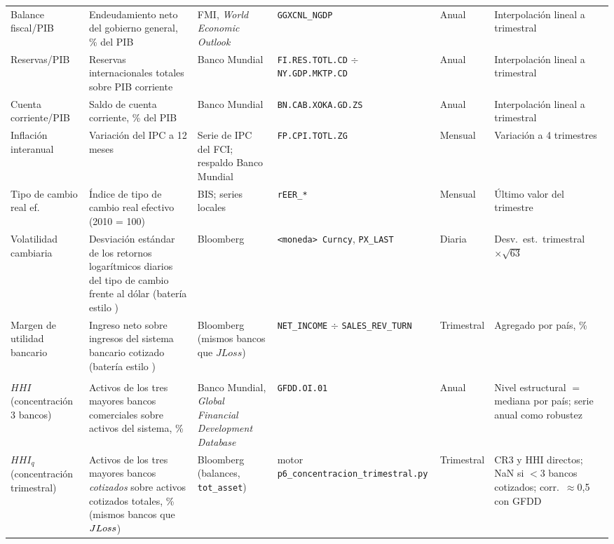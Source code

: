 \begin{footnotesize}
\begin{longtable}{%
  >{\Lc}p{2.15cm}%
  >{\Lc}p{2.7cm}%
  >{\Lc}p{1.8cm}%
  >{\Lc}p{2.85cm}%
  >{\Lc}p{1.75cm}%
  >{\Lc}p{2.5cm}}
Balance fiscal/PIB & Endeudamiento neto del gobierno general, \% del PIB & FMI, \textit{World Economic Outlook} & \texttt{GGXCNL\_NGDP} & Anual & Interpolación lineal a trimestral \\
Reservas/PIB & Reservas internacionales totales sobre PIB corriente & Banco Mundial & \texttt{FI.\allowbreak RES.\allowbreak TOTL.\allowbreak CD} $\div$ \texttt{NY.\allowbreak GDP.\allowbreak MKTP.\allowbreak CD} & Anual & Interpolación lineal a trimestral \\
Cuenta corriente/PIB & Saldo de cuenta corriente, \% del PIB & Banco Mundial & \texttt{BN.\allowbreak CAB.\allowbreak XOKA.\allowbreak GD.\allowbreak ZS} & Anual & Interpolación lineal a trimestral \\
Inflación interanual & Variación del IPC a 12 meses & Serie de IPC del FCI; respaldo Banco Mundial & \texttt{FP.\allowbreak CPI.\allowbreak TOTL.\allowbreak ZG} & Mensual & Variación a 4 trimestres \\
Tipo de cambio real ef. & Índice de tipo de cambio real efectivo (2010 = 100) & BIS; series locales & \texttt{rEER\_*} & Mensual & Último valor del trimestre \\
Volatilidad cambiaria & Desviación estándar de los retornos logarítmicos diarios del tipo de cambio frente al dólar (batería estilo \citealp{Chari2024b}) & Bloomberg & \texttt{<moneda> Curncy}, \texttt{PX\_LAST} & Diaria & Desv.\ est.\ trimestral $\times\sqrt{63}$ \\
Margen de utilidad bancario & Ingreso neto sobre ingresos del sistema bancario cotizado (batería estilo \citealp{Chari2024b}) & Bloomberg (mismos bancos que $JLoss$) & \texttt{NET\_\allowbreak INCOME} $\div$ \texttt{SALES\_\allowbreak REV\_\allowbreak TURN} & Trimestral & Agregado por país, \% \\
\addlinespace
\multicolumn{6}{l}{\textbf{\textit{Concentración bancaria e instituciones}}}\\
\addlinespace
$HHI$ (concentración 3 bancos) & Activos de los tres mayores bancos comerciales sobre activos del sistema, \% & Banco Mundial, \textit{Global Financial Development Database} & \texttt{GFDD.\allowbreak OI.01} & Anual & Nivel estructural $=$ mediana por país; serie anual como robustez \\
$HHI_q$ (concentración trimestral) & Activos de los tres mayores bancos \emph{cotizados} sobre activos cotizados totales, \% (mismos bancos que $JLoss$) & Bloomberg (balances, \texttt{tot\_\allowbreak asset}) & motor \texttt{p6\_\allowbreak concentracion\_\allowbreak trimestral.py} & Trimestral & CR3 y HHI directos; NaN si $<$3 bancos cotizados; corr.\ $\approx$0,5 con GFDD \\

\end{longtable}
\end{footnotesize}
